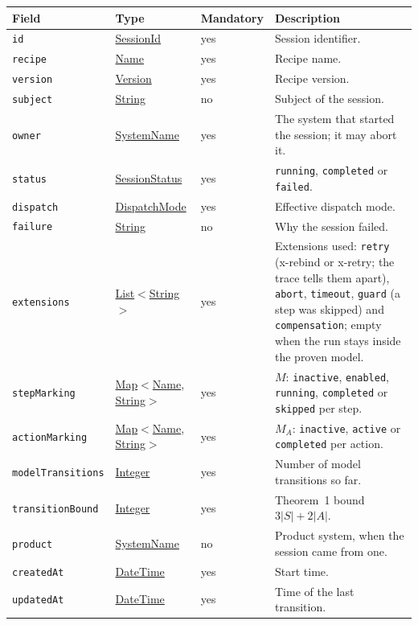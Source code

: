 \documentclass[a4paper]{arrowhead}
\newcommand{\mref}[1]{{\textcolor{ArrowheadPurple}{\hyperref[sec:model:#1]{#1}}}}
\newcommand{\pref}[1]{{\textcolor{ArrowheadGrey}{\hyperref[sec:model:primitives:#1]{#1}}}}
\begin{document}
{\small
\begin{longtable}{|p{3.7cm}|p{4.2cm}|p{1.6cm}|p{6.3cm}|}

\hline
\rowcolor{gray!33} Field & Type & Mandatory & Description \\ \hline
\endhead
\texttt{id} & \pref{SessionId} & yes & Session identifier. \\ \hline
\texttt{recipe} & \pref{Name} & yes & Recipe name. \\ \hline
\texttt{version} & \pref{Version} & yes & Recipe version. \\ \hline
\texttt{subject} & \pref{String} & no & Subject of the session. \\ \hline
\texttt{owner} & \pref{SystemName} & yes & The system that started the session; it may abort it. \\ \hline
\texttt{status} & \mref{SessionStatus} & yes & \texttt{running}, \texttt{completed} or \texttt{failed}. \\ \hline
\texttt{dispatch} & \mref{DispatchMode} & yes & Effective dispatch mode. \\ \hline
\texttt{failure} & \pref{String} & no & Why the session failed. \\ \hline
\texttt{extensions} & \pref{List}$<$\pref{String}$>$ & yes & Extensions used: \texttt{retry} (x-rebind or x-retry; the trace tells them apart), \texttt{abort}, \texttt{timeout}, \texttt{guard} (a step was skipped) and \texttt{compensation}; empty when the run stays inside the proven model. \\ \hline
\texttt{stepMarking} & \pref{Map}$<$\pref{Name}, \pref{String}$>$ & yes & $M$: \texttt{inactive}, \texttt{enabled}, \texttt{running}, \texttt{completed} or \texttt{skipped} per step. \\ \hline
\texttt{actionMarking} & \pref{Map}$<$\pref{Name}, \pref{String}$>$ & yes & $M_A$: \texttt{inactive}, \texttt{active} or \texttt{completed} per action. \\ \hline
\texttt{model\allowbreak{}Transitions} & \pref{Integer} & yes & Number of model transitions so far. \\ \hline
\texttt{transition\allowbreak{}Bound} & \pref{Integer} & yes & Theorem~1 bound $3|S| + 2|A|$. \\ \hline
\texttt{product} & \pref{SystemName} & no & Product system, when the session came from one. \\ \hline
\texttt{createdAt} & \pref{DateTime} & yes & Start time. \\ \hline
\texttt{updatedAt} & \pref{DateTime} & yes & Time of the last transition. \\ \hline
\end{longtable}
}
\end{document}
